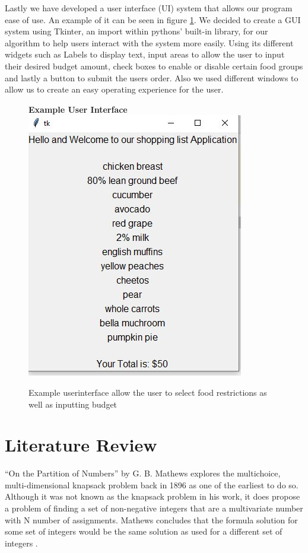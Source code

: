 \documentclass[10pt,journal,compsoc]{IEEEtran}
\begin{document}
Lastly we have developed a user interface (UI) system that allows our program
ease of use. An example of it can be seen in figure \ref{fig:UI3}. We decided to
create a GUI system using Tkinter, an import within pythons' built-in library,
for our algorithm to help users interact with the system more easily. Using its
different widgets such as Labels to display text, input areas to allow the user
to input their desired budget amount, check boxes to enable or disable certain
food groups and lastly a button to submit the users order. Also we used
different windows to allow us to create an easy operating experience for the
user.

\begin{figure}[h]
    \centering
    \textbf{Example User Interface}
    \includegraphics[width=\columnwidth]{assets/AIprojectUI3.JPG}
    \caption{Example userinterface allow the user to select food restrictions as well as inputting budget}
    \label{fig:UI3}
\end{figure}

\section{Literature Review}
“On the Partition of Numbers” by G. B. Mathews explores the multichoice,
multi-dimensional knapsack problem back in 1896 as one of the earliest to do so.
Although it was not known as the knapsack problem in his work, it does propose a
problem of finding a set of non-negative integers that are a multivariate number
with N number of assignments. Mathews concludes that the formula solution for
some set of integers would be the same solution as used for a different set of
integers \cite{mathews_partition_1896}.
\end{document}
